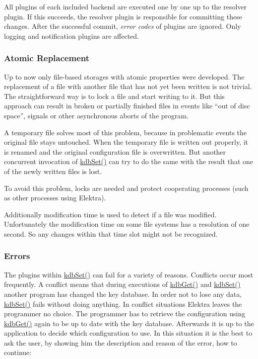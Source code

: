 All plugins of each included backend are executed one by one up to the resolver plugin. If this succeeds, the resolver plugin is responsible for committing these changes. After the successful commit, {\itshape error codes} of plugins are ignored. Only logging and notification plugins are affected.

\subsubsection*{Atomic Replacement}

Up to now only file-\/based storages with atomic properties were developed. The replacement of a file with another file that has not yet been written is not trivial. The straightforward way is to lock a file and start writing to it. But this approach can result in broken or partially finished files in events like “out of disc space”, signals or other asynchronous aborts of the program.

A temporary file solves most of this problem, because in problematic events the original file stays untouched. When the temporary file is written out properly, it is renamed and the original configuration file is overwritten. But another concurrent invocation of {\ttfamily \hyperlink{group__kdb_ga11436b058408f83d303ca5e996832bcf}{kdb\+Set()}} can try to do the same with the result that one of the newly written files is lost.

To avoid this problem, locks are needed and protect cooperating processes (such as other processes using Elektra).

Additionally modification time is used to detect if a file was modified. Unfortunately the modification time on some file systems has a resolution of one second. So any changes within that time slot might not be recognized.

\subsubsection*{Errors}

The plugins within {\ttfamily \hyperlink{group__kdb_ga11436b058408f83d303ca5e996832bcf}{kdb\+Set()}} can fail for a variety of reasons. Conflicts occur most frequently. A conflict means that during executions of {\ttfamily \hyperlink{group__kdb_ga28e385fd9cb7ccfe0b2f1ed2f62453a1}{kdb\+Get()}} and {\ttfamily \hyperlink{group__kdb_ga11436b058408f83d303ca5e996832bcf}{kdb\+Set()}} another program has changed the key database. In order not to lose any data, {\ttfamily \hyperlink{group__kdb_ga11436b058408f83d303ca5e996832bcf}{kdb\+Set()}} fails without doing anything. In conflict situations Elektra leaves the programmer no choice. The programmer has to retrieve the configuration using {\ttfamily \hyperlink{group__kdb_ga28e385fd9cb7ccfe0b2f1ed2f62453a1}{kdb\+Get()}} again to be up to date with the key database. Afterwards it is up to the application to decide which configuration to use. In this situation it is the best to ask the user, by showing him the description and reason of the error, how to continue\+:


